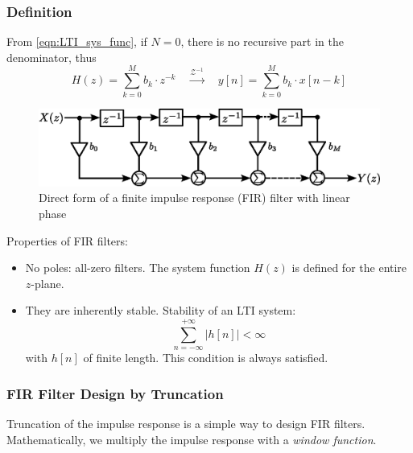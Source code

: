 \subsubsection{Definition}
From \autoref{eqn:LTI_sys_func}, if $N=0$, there is no recursive part in the denominator, thus
\[
    H(z) = \sum_{k=0}^{M} b_k \cdot z^{-k} \quad \xrightarrow{\mathcal{Z}^{-1}} \quad
    y[n] = \sum_{k=0}^{M} b_k \cdot x[n-k]
\]
\begin{figure}[H]
    \centering
    \includegraphics[width=.8\textwidth]{images/FIR_filter.eps}
    \caption{Direct form of a finite impulse response (FIR) filter with linear phase}
    \label{fig:FIR}
\end{figure}

Properties of FIR filters:
\begin{itemize}
    \item No poles: all-zero filters. The system function $H(z)$ is defined for the entire $z$-plane.
    \item They are inherently stable. Stability of an LTI system:
    \[
        \sum_{n=-\infty}^{+\infty} \lvert h[n] \rvert < \infty
    \]
    with $h[n]$ of finite length. This condition is always satisfied.
\end{itemize}

\subsubsection{FIR Filter Design by Truncation}
Truncation of the impulse response is a simple way to design FIR filters. Mathematically, we multiply the impulse response with a \textit{window function}.

